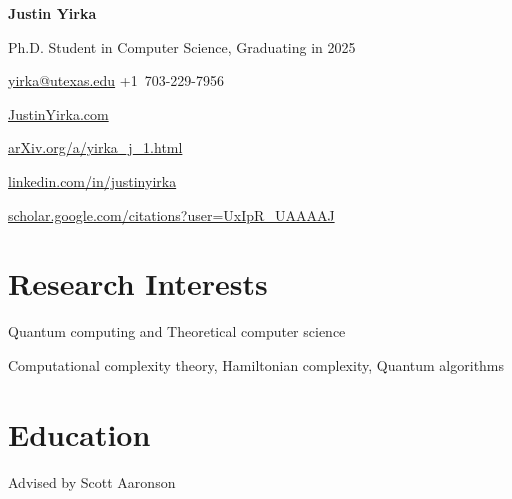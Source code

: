 \documentclass[11pt,letterpaper,serif]{moderncv}
\begin{document}
\pagestyle{normal}


\thispagestyle{firstpage}

\begin{center}
	{\LARGE\textbf{Justin Yirka}}

	\smallskip{}

	Ph.D. Student in Computer Science, Graduating in 2025

	\medskip{}

	\href{mailto:yirka@utexas.edu}{yirka@utexas.edu}
	\qquad
	+1~703-229-7956

	\href{https://www.justinyirka.com}{JustinYirka.com}

	\medskip{}

	\href{https://arxiv.org/a/yirka_j_1.html}{arXiv.org/a/yirka\_j\_1.html}

	\faLinkedin{} \href{https://www.linkedin.com/in/justinyirka/}{linkedin.com/in/justinyirka}

	\faGraduationCap{} \href{https://scholar.google.com/citations?user=UxIpR_UAAAAJ}{scholar.google.com/citations?user=UxIpR\_UAAAAJ}
\end{center}


\setlength{\parskip}{0em}

\section{Research Interests}
Quantum computing and Theoretical computer science

\qquad Computational complexity theory, Hamiltonian complexity, Quantum algorithms


\section{Education}


{
		\normalsize
		\begin{adjustwidth}{.25in}{}
			Advised by Scott Aaronson
		\end{adjustwidth}
}
\end{document}
